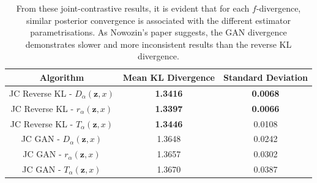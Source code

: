 \documentclass[honours,12pt]{unswthesis}
\numberwithin{equation}{section}
\theoremstyle{definition}
\begin{document}
\begin{table}[h!]
\centering
\begin{tabular}{|c|c|c|}
\hline
Algorithm & Mean KL Divergence & Standard Deviation\\
\hline
JC Reverse KL - $D_\alpha(\bm{z},x)$ & \textbf{1.3416} & \textbf{0.0068}\\
\hline
JC Reverse KL - $r_\alpha(\bm{z},x)$ & \textbf{1.3397} & \textbf{0.0066}\\
\hline
JC Reverse KL - $T_\alpha(\bm{z},x)$ & \textbf{1.3446} & 0.0108\\
\hline
JC GAN - $D_\alpha(\bm{z},x)$ & 1.3648 & 0.0242\\
\hline
JC GAN - $r_\alpha(\bm{z},x)$ & 1.3657 & 0.0302\\
\hline
JC GAN - $T_\alpha(\bm{z},x)$ & 1.3670 & 0.0387\\
\hline
\end{tabular}
\caption{\small From these joint-contrastive results, it is evident that for each $f$-divergence, similar posterior convergence is associated with the different estimator parametrisations. As Nowozin's paper suggests, the GAN divergence demonstrates slower and more inconsistent results than the reverse KL divergence.}
\label{tab:6.2}
\end{table}
\end{document}
